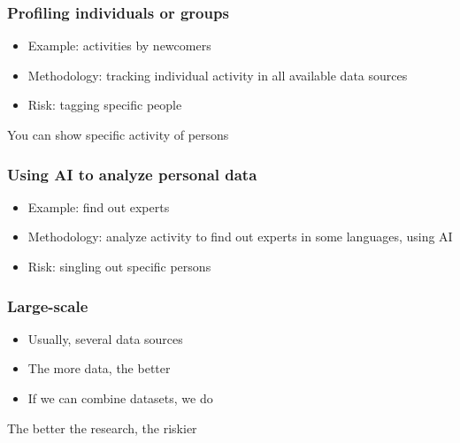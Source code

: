 \documentclass[17pt,aspectratio=169,hyperref={pdfusetitle,colorlinks,allcolors=olive}]{beamer}
\begin{document}
\begin{frame}[fragile]
  \frametitle{Profiling individuals or groups}

  \begin{itemize}
  \item Example: activities by newcomers

  \item Methodology: tracking individual activity in all available data sources

  \item Risk: tagging specific people
  \end{itemize}
  
  \begin{flushright}
    You can show specific activity of persons
  \end{flushright}
\end{frame}

\begin{frame}[fragile]
  \frametitle{Using AI to analyze personal data}

  \begin{itemize}
  \item Example: find out experts

  \item Methodology: analyze activity to find out experts in some languages, using AI

  \item Risk: singling out specific persons
  \end{itemize}
  
\end{frame}

\begin{frame}[fragile]
  \frametitle{Large-scale}

  \begin{itemize}
  \item Usually, several data sources
  \item The more data, the better
  \item If we can combine datasets, we do
  \end{itemize}

  \begin{flushright}
    The better the research, the riskier
  \end{flushright}
\end{frame}
\end{document}
